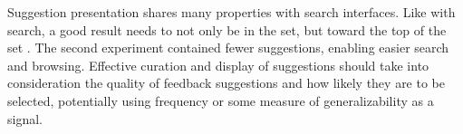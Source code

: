 Suggestion presentation shares many properties with search interfaces. Like with search, a good result needs to not only be in the set, but toward the top of the set \cite{Hearst2009Book}. The second experiment contained fewer suggestions, enabling easier search and browsing. Effective curation and display of suggestions should take into consideration the quality of feedback suggestions and how likely they are to be selected, potentially using frequency or some measure of generalizability as a signal. 
